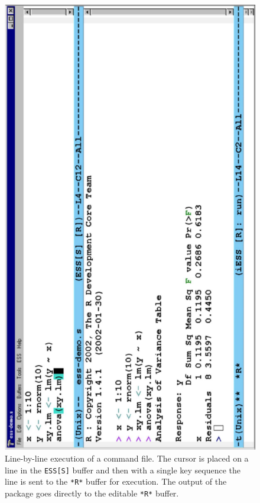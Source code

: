 \documentclass{article}
\newif\ifdraft
\newcommand{\stexttt}[1]{{\small\texttt{#1}}}
\newcommand{\emptyfig}{
\hspace*{42pt}\rule{324pt}{.25pt}\\
\hspace*{42pt}\rule{.25pt}{10pc}
\rule{316pt}{.25pt}
\rule{.25pt}{10pc}}
\begin{document}
\begin{figure}[tb]
  \centering
  \ifdraft
     \emptyfig
  \else
     \includegraphics[angle=270,width=\textwidth]{ess-demo}
  \fi
  \caption{Line-by-line execution of a command file. The cursor is
    placed on a line in the \stexttt{ESS[S]} buffer and then with a single
    key sequence
    the line is sent to the \stexttt{*R*} buffer for
    execution.  The output of the package goes directly to the
    editable \stexttt{*R*} buffer.}
  \label{f.ess-demo}
\end{figure}
\end{document}
